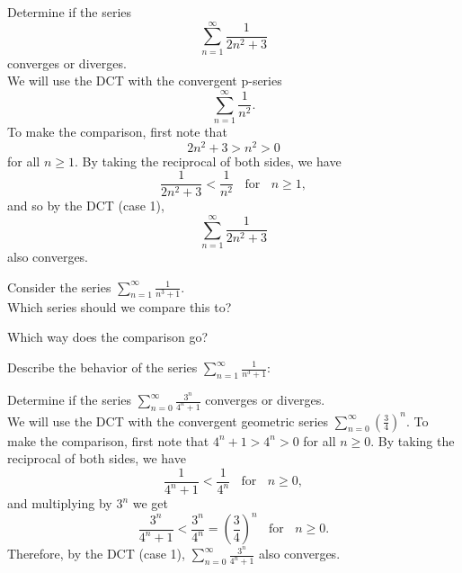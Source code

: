 \documentclass{ximera}
\begin{document}
\begin{example}[Convergence] %
Determine if the series 
\[
\sum_{n=1}^\infty \frac{1}{2n^2 + 3}
\]
converges or diverges.\\
We will use the DCT with the convergent p-series 
\[
\sum_{n=1}^\infty \frac{1}{n^2}.
\] 
To make the comparison, first note that 
\[
2n^2 + 3 > n^2 > 0
\]
 for all $n \geq 1$. By taking the reciprocal of both sides,
we have 
\[
\frac{1}{2n^2 + 3} < \frac{1}{n^2} \; \; \text{ for } \; \; n \geq 1,
\]
and so by the DCT (case 1), 
\[
\sum_{n=1}^\infty \frac{1}{2n^2 + 3}
\]
 also converges.
\end{example}


\begin{problem}[DCT 1]
Consider the series $\displaystyle{\sum_{n=1}^\infty \frac{1}{n^3 + 1}}$.\\
Which series should we compare this to?
\begin{center}
\begin{multipleChoice}
\choice{\[\sum_{n=1}^\infty \frac{1}{n^2}\]}
\choice[correct]{\[\sum_{n=1}^\infty \frac{1}{n^3}\]}
\choice{\[\sum_{n=1}^\infty \frac{1}{3^n}\]}
\end{multipleChoice}
\end{center}

Which way does the comparison go?
\begin{center}
\begin{multipleChoice}
\end{multipleChoice}
\end{center}

Describe the behavior of the series $\displaystyle{\sum_{n=1}^\infty \frac{1}{n^3 + 1}:}$
\begin{center}
\begin{multipleChoice}
\end{multipleChoice}
\end{center}

\end{problem}


\begin{example}[Convergence] %
Determine if the series $\sum_{n=0}^\infty \frac{3^n}{4^n + 1}$ converges or diverges.\\
We will use the DCT with the convergent geometric series $\sum_{n=0}^\infty \left(\frac34\right)^n$. 
To make the comparison, first note that $4^n + 1 > 4^n > 0$ for all $n \geq 0$. By taking the reciprocal of both sides,
we have 
\[
\frac{1}{4^n + 1} < \frac{1}{4^n} \; \; \text{ for } \;\; n \geq 0,
\]
and multiplying by $3^n$ we get
\[
\frac{3^n}{4^n + 1} < \frac{3^n}{4^n} = \left(\frac34\right)^n \;\; \text{ for } \;\; n \geq 0.
\]
Therefore, by the DCT (case 1), $\sum_{n=0}^\infty \frac{3^n}{4^n + 1}$ also converges.
\end{example}
\end{document}
